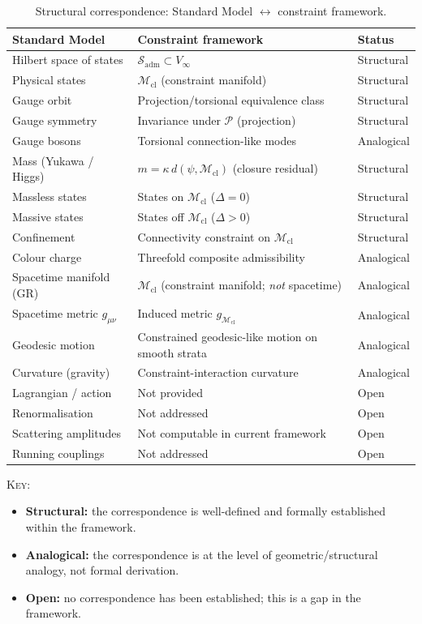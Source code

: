 \documentclass[12pt]{article}
\newcommand{\Mcl}{\mathcal{M}_{\mathrm{cl}}}
\newcommand{\Pcal}{\mathcal{P}}
\newcommand{\Sadm}{\mathcal{S}_{\mathrm{adm}}}
\begin{document}
\begin{table}[ht]
\centering
\caption{Structural correspondence: Standard Model $\leftrightarrow$ constraint framework.}
\label{tab:dictionary}
\begin{tabular}{@{}lll@{}}
\toprule
Standard Model & Constraint framework & Status \\
\midrule
Hilbert space of states & $\Sadm \subset V_\infty$ & Structural \\
Physical states & $\Mcl$ (constraint manifold) & Structural \\
Gauge orbit & Projection/torsional equivalence class & Structural \\
Gauge symmetry & Invariance under $\Pcal$ (projection) & Structural \\
Gauge bosons & Torsional connection-like modes & Analogical \\
Mass (Yukawa / Higgs) & $m = \kappa\, d(\psi, \Mcl)$ (closure residual) & Structural \\
Massless states & States on $\Mcl$ ($\Delta = 0$) & Structural \\
Massive states & States off $\Mcl$ ($\Delta > 0$) & Structural \\
Confinement & Connectivity constraint on $\Mcl$ & Structural \\
Colour charge & Threefold composite admissibility & Analogical \\
Spacetime manifold (GR) & $\Mcl$ (constraint manifold; \textit{not} spacetime) & Analogical \\
Spacetime metric $g_{\mu\nu}$ & Induced metric $g_{\Mcl}$ & Analogical \\
Geodesic motion & Constrained geodesic-like motion on smooth strata & Analogical \\
Curvature (gravity) & Constraint-interaction curvature & Analogical \\
Lagrangian / action & Not provided & Open \\
Renormalisation & Not addressed & Open \\
Scattering amplitudes & Not computable in current framework & Open \\
Running couplings & Not addressed & Open \\
\bottomrule
\end{tabular}
\end{table}

\textsc{Key:}
\begin{itemize}
    \item \textbf{Structural:} the correspondence is well-defined and formally established within the framework.
    \item \textbf{Analogical:} the correspondence is at the level of geometric/structural analogy, not formal derivation.
    \item \textbf{Open:} no correspondence has been established; this is a gap in the framework.
\end{itemize}
\end{document}
